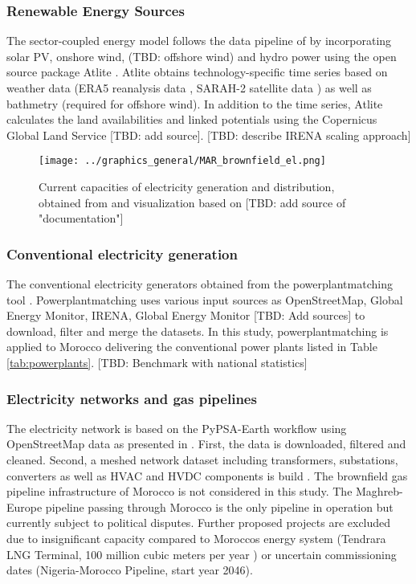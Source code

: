 \subsubsection{Renewable Energy Sources}
The sector-coupled energy model follows the data pipeline of \cite{Parzen2023a} by incorporating solar PV, onshore wind, (TBD: offshore wind) and hydro power using the open source package Atlite \cite{Hofmann2021}.
Atlite obtains technology-specific time series based on weather data (ERA5 reanalysis data \cite{Hersbach2020}, SARAH-2 satellite data \cite{Pfeifroth2017}) as well as bathmetry \cite{GCG2022} (required for offshore wind). In addition to the time series, Atlite calculates the land availabilities and linked potentials using the Copernicus Global Land Service
[TBD: add source]. [TBD: describe IRENA scaling approach]





\begin{figure}[h!]
    \centering
    \texttt{[image: ../graphics\_general/MAR\_brownfield\_el.png]}
    \caption{Current capacities of electricity generation and distribution, obtained from \cite{Parzen2022} and visualization based on [TBD: add source of "documentation"]}
    \label{fig:MAR_brownfield}
\end{figure}


\subsubsection{Conventional electricity generation}

The conventional electricity generators obtained from the powerplantmatching tool \cite{Powerplantmatching2019}. Powerplantmatching uses various input sources as OpenStreetMap, Global Energy Monitor, IRENA, Global Energy Monitor [TBD: Add sources] to download, filter and merge the datasets. 
In this study, powerplantmatching is applied to Morocco delivering the conventional power plants listed in Table \ref{tab:powerplants}. 
[TBD: Benchmark with national statistics]


\subsubsection{Electricity networks and gas pipelines}
The electricity network is based on the PyPSA-Earth workflow using OpenStreetMap data \cite{OpenStreetMap2022} as presented in \cite{Parzen2023}. First, the data is downloaded, filtered and cleaned. Second, a meshed network dataset including transformers, substations, converters as well as HVAC and HVDC components is build \cite{Parzen2023a}. 
The brownfield gas pipeline infrastructure of Morocco is not considered in this study. The Maghreb-Europe pipeline passing through Morocco is the only pipeline in operation but currently subject to political disputes. Further proposed projects are excluded due to insignificant capacity compared to Moroccos energy system (Tendrara LNG Terminal, 100 million cubic meters per year ) or uncertain commissioning dates (Nigeria-Morocco Pipeline, start year 2046).

